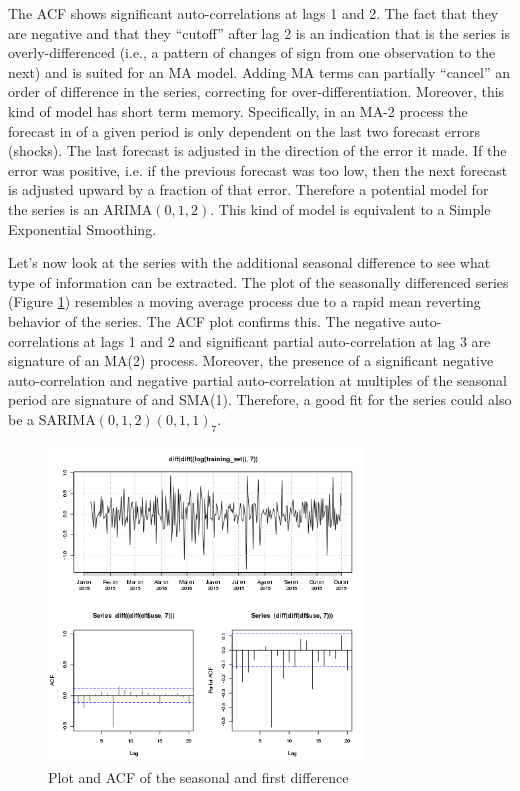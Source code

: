 The ACF shows significant auto-correlations at lags 1 and 2. The fact that they are negative and that they “cutoff” after lag 2 is an indication that is the series is overly-differenced (i.e., a pattern of changes of sign from one observation to the next) and is suited for an MA model. Adding MA terms can partially “cancel” an order of difference in the series, correcting for over-differentiation. Moreover, this kind of model has short term memory. Specifically,  in an MA-2 process the forecast in of a given period is only dependent on the last two forecast errors (shocks). The last forecast is adjusted in the direction of the error it made. If the error was positive, i.e. if the previous forecast was too low, then the next forecast is adjusted upward by a fraction of that error. Therefore a potential model for the series is an ARIMA$(0,1,2)$. This kind of model is equivalent to a Simple Exponential Smoothing. 

Let's now look at the series with the additional seasonal difference to see what type of information can be extracted.  The plot of the seasonally differenced series (Figure \ref{fig:seasonal_difference_acf}) resembles a moving average process due to a rapid mean reverting behavior of the series.  The ACF plot confirms this. The negative auto-correlations at lags 1 and 2 and significant partial auto-correlation at lag 3 are signature of an MA(2) process. Moreover, the presence of a significant negative auto-correlation and negative partial auto-correlation at multiples of the seasonal period are signature of and SMA(1). Therefore, a good fit for the series could also be a SARIMA$(0,1,2)(0,1,1)_7$.

\begin{figure}[!htb]
\begin{center}
\includegraphics[width=8.4cm]{seasonal_difference_acf.png}    %
\caption{Plot and ACF of the seasonal and first difference} 
\label{fig:seasonal_difference_acf}
\end{center}
\end{figure}

